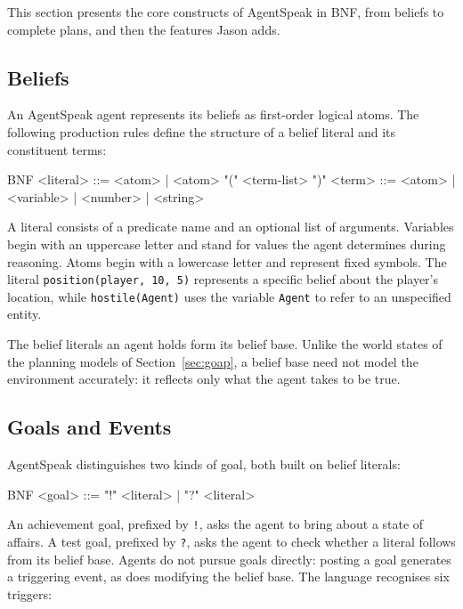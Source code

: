 This section presents the core constructs of AgentSpeak in BNF, from beliefs to complete plans, and then the features Jason adds.
 
\subsection{Beliefs}
\label{sec:agentspeak-beliefs}
 
An AgentSpeak agent represents its beliefs as first-order logical atoms. The following production rules define the structure of a belief literal and its constituent terms:
 
\begin{codeblock}[]{BNF}
    <literal> ::= <atom> | <atom> "(" <term-list> ")" 
    <term> ::= <atom> | <variable> | <number> | <string>
\end{codeblock}
 
A literal consists of a predicate name and an optional list of arguments. Variables begin with an uppercase letter and stand for values the agent determines during reasoning. Atoms begin with a lowercase letter and represent fixed symbols. The literal \lstinline|position(player, 10, 5)| represents a specific belief about the player's location, while \lstinline|hostile(Agent)| uses the variable \lstinline|Agent| to refer to an unspecified entity.
 
The belief literals an agent holds form its belief base. Unlike the world states of the planning models of Section~\ref{sec:goap}, a belief base need not model the environment accurately: it reflects only what the agent takes to be true.
 
\subsection{Goals and Events}
\label{sec:agentspeak-events}
 
AgentSpeak distinguishes two kinds of goal, both built on belief literals:
 
\begin{codeblock}[]{BNF}
    <goal> ::= "!" <literal> | "?" <literal>
\end{codeblock}
 
An achievement goal, prefixed by \lstinline|!|, asks the agent to bring about a state of affairs. A test goal, prefixed by \lstinline|?|, asks the agent to check whether a literal follows from its belief base. Agents do not pursue goals directly: posting a goal generates a triggering event, as does modifying the belief base. The language recognises six triggers:
 
